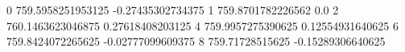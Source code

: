 0 759.5958251953125 -0.27435302734375
1 759.8701782226562 0.0
2 760.1463623046875 0.27618408203125
4 759.9957275390625 0.12554931640625
6 759.8424072265625 -0.02777099609375
8 759.71728515625 -0.15289306640625
